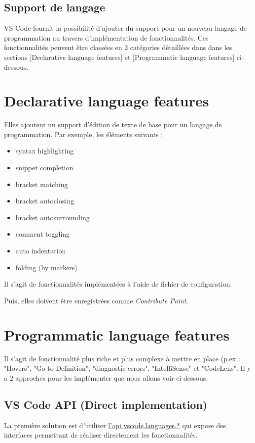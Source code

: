 \documentclass[
    iict, %
    il, %
]{heig-tb}
\begin{document}
\subsection{Support de langage}
VS Code fournit la possibilité d'ajouter du support pour un nouveau langage de programmation au travers d'implémentation de fonctionnalités. Ces fonctionnalités peuvent être classées en 2 catégories détaillées
dans dans les sections \hyperref[Declarative language features][Declarative language features] et \hyperref[Programmatic language features][Programmatic language features] ci-dessous.

\section{Declarative language features}\label{Declarative language features}
Elles ajoutent un support d'édition de texte de base pour un langage de programmation.
Par exemple, les éléments suivants :

\begin{itemize}
    \item syntax highlighting
    \item snippet completion
    \item bracket matching
    \item bracket autoclosing
    \item bracket autosurrounding
    \item comment toggling
    \item auto indentation
    \item folding (by markers)
\end{itemize}

Il s'agit de fonctionnalités implémentées à l'aide de fichier de configuration.

Puis, elles doivent être enregistrées comme \emph{Contribute Point}.

\section{Programmatic language features}\label{Programmatic language features}
Il s'agit de fonctionnalité plus riche et plus complexe à mettre en place (p.ex : "Hovers", "Go to Definition", "diagnostic errors", "IntelliSense" \space et "CodeLens".
Il y a 2 approches pour les implémenter que nous allons voir ci-dessous.

\subsection{VS Code API (Direct implementation)}
La première solution est d'utiliser \href{https://code.visualstudio.com/api/references/vscode-api#languages}{l'api vscode.languages.*} qui expose des interfaces
permettant de réaliser directement les fonctionnalités.
\end{document}
